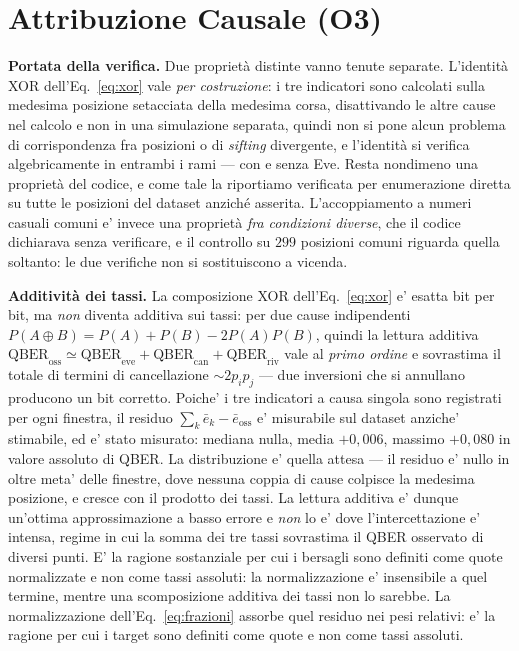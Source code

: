 \documentclass[10pt,conference,a4paper,twocolumn]{IEEEtran}
\begin{document}
\section{Attribuzione Causale (O3)}

\textbf{Portata della verifica.} Due proprietà distinte vanno tenute separate. L'identità XOR dell'Eq.~\eqref{eq:xor} vale \emph{per costruzione}: i tre indicatori sono calcolati sulla medesima posizione setacciata della medesima corsa, disattivando le altre cause nel calcolo e non in una simulazione separata, quindi non si pone alcun problema di corrispondenza fra posizioni o di \textit{sifting} divergente, e l'identità si verifica algebricamente in entrambi i rami — con e senza Eve. Resta nondimeno una proprietà del codice, e come tale la riportiamo verificata per enumerazione diretta su tutte le posizioni del dataset anziché asserita. L'accoppiamento a numeri casuali comuni e' invece una proprietà \emph{fra condizioni diverse}, che il codice dichiarava senza verificare, e il controllo su $299$ posizioni comuni riguarda quella soltanto: le due verifiche non si sostituiscono a vicenda.

\textbf{Additività dei tassi.} La composizione XOR dell'Eq.~\eqref{eq:xor} e' esatta bit per bit, ma \emph{non} diventa additiva sui tassi: per due cause indipendenti $P(A \oplus B) = P(A) + P(B) - 2P(A)P(B)$, quindi la lettura additiva $\text{QBER}_{\text{oss}} \simeq \text{QBER}_{\text{eve}} + \text{QBER}_{\text{can}} + \text{QBER}_{\text{riv}}$ vale al \emph{primo ordine} e sovrastima il totale di termini di cancellazione $\sim 2 p_i p_j$ — due inversioni che si annullano producono un bit corretto. Poiche' i tre indicatori a causa singola sono registrati per ogni finestra, il residuo $\sum_k \bar{e}_k - \bar{e}_{\text{oss}}$ e' misurabile sul dataset anziche' stimabile, ed e' stato misurato: mediana nulla, media $+0{,}006$, massimo $+0{,}080$ in valore assoluto di QBER. La distribuzione e' quella attesa — il residuo e' nullo in oltre meta' delle finestre, dove nessuna coppia di cause colpisce la medesima posizione, e cresce con il prodotto dei tassi. La lettura additiva e' dunque un'ottima approssimazione a basso errore e \emph{non} lo e' dove l'intercettazione e' intensa, regime in cui la somma dei tre tassi sovrastima il QBER osservato di diversi punti. E' la ragione sostanziale per cui i bersagli sono definiti come quote normalizzate e non come tassi assoluti: la normalizzazione e' insensibile a quel termine, mentre una scomposizione additiva dei tassi non lo sarebbe. La normalizzazione dell'Eq.~\eqref{eq:frazioni} assorbe quel residuo nei pesi relativi: e' la ragione per cui i target sono definiti come quote e non come tassi assoluti.
\end{document}
